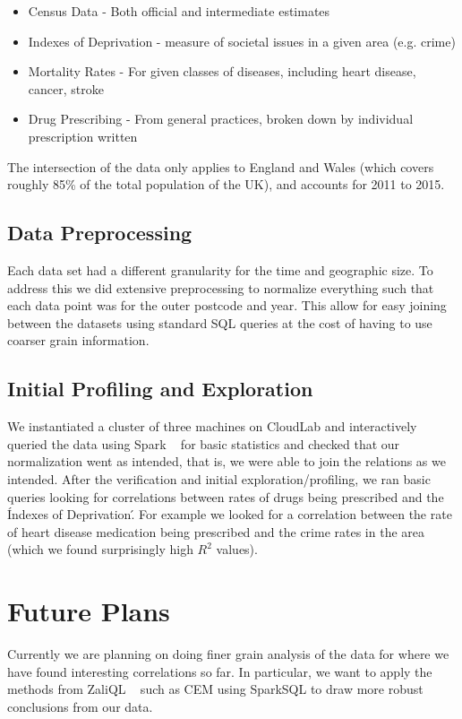 \documentclass[a4paper]{article}
\begin{document}
		\begin{itemize}
			\item Census Data - Both official and intermediate estimates
			\item Indexes of Deprivation - measure of societal issues in a given area (e.g. crime)
			\item Mortality Rates - For given classes of diseases, including heart disease, cancer, stroke
			\item Drug Prescribing - From general practices, broken down by individual prescription written
		\end{itemize}
		The intersection of the data only applies to England and Wales (which covers roughly 85\% of the total population of the UK),
		and accounts for 2011 to 2015.


	\subsection{Data Preprocessing}
		Each data set had a different granularity for the time and geographic size. To address this we 
		did extensive preprocessing to normalize everything such that each data point was for the outer postcode
		and year. This allow for easy joining between the datasets using standard SQL queries at the cost of 
		having to use coarser grain information.

	\subsection{Initial Profiling and Exploration}
		We instantiated a cluster of three machines on CloudLab and interactively queried the data using Spark ~\cite{ref:SparkSQL} for basic statistics and 
		checked that our normalization went as intended, that is, we were able to join the relations as we intended.
		After the verification and initial exploration/profiling, we ran basic queries looking for correlations between 
		rates of drugs being prescribed and the \'Indexes of Deprivation\'. For example we looked for a correlation between the 
		rate of heart disease medication being prescribed and the crime rates in the area (which we found surprisingly high $R^2$ values).



\section{Future Plans}
	Currently we are planning on doing finer grain analysis of the data for where we have found interesting correlations
	so far.  In particular, we want to apply the methods from ZaliQL ~\cite{ref:ZaliQL} such as CEM using SparkSQL to 
	draw more robust conclusions from our data.
	
\end{document}
